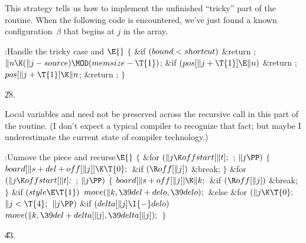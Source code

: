 This strategy tells us how to implement the unfinished ``tricky'' part
of the  routine. When the following code is encountered, we've
just
found a known configuration~$\beta$ that begins at $j$ in the 
array.

\Y\B\4:Handle the tricky case and \X${}\E{}$\6
${}\{{}$\1\6
\&{if} ${}(\\{bound}<\\{shortcut}){}$\1\5
\&{return} ;\2\6
${}\|n\K(\|j-\\{source})\MOD(\\{memsize}-\T{1}){}$;\6
\&{if} ${}(\\{pos}[\|j+\T{1}]\E\|n){}$\1\5
\&{return} ;\2\6
${}\\{pos}[\|j+\T{1}]\K\|n{}$;\6
\&{return} ;\6
\4${}\}{}$\2\par
\U28.\fi

Local variables  and  need not be
preserved across the recursive
call in this part of the  routine. (I don't expect a typical
compiler
to recognize that fact; but maybe I underestimate the current state
of compiler technology.)

\Y\B\4:Unmove the piece and recurse\X${}\E{}$\6
${}\{{}$\1\6
\&{for} ${}(\|j\K\\{offstart}[\|t];{}$  ; ${}\|j\PP){}$\5
${}\{{}$\1\6
${}\\{board}[\|s+\\{del}+\\{off}[\|j]]\K\T{0};{}$\6
\&{if} ${}(\R\\{off}[\|j]){}$\1\5
\&{break};\2\6
\4${}\}{}$\2\6
\&{for} ${}(\|j\K\\{offstart}[\|t];{}$  ; ${}\|j\PP){}$\5
${}\{{}$\1\6
${}\\{board}[\|s+\\{off}[\|j]]\K\|k;{}$\6
\&{if} ${}(\R\\{off}[\|j]){}$\1\5
\&{break};\2\6
\4${}\}{}$\2\6
\&{if} ${}(\\{style}\E\T{1}){}$\1\5
${}\\{move}(\|k,\39\\{del}+\\{delo},\39\\{delo});{}$\2\6
\&{else}\1\6
\&{for} ${}(\|j\K\T{0};{}$ ${}\|j<\T{4};{}$ ${}\|j\PP){}$\1\6
\&{if} ${}(\\{delta}[\|j]\I{-}\\{delo}){}$\1\5
${}\\{move}(\|k,\39\\{del}+\\{delta}[\|j],\39\\{delta}[\|j]);{}$\2\2\2\6
\4${}\}{}$\2\par
\U43.\fi

